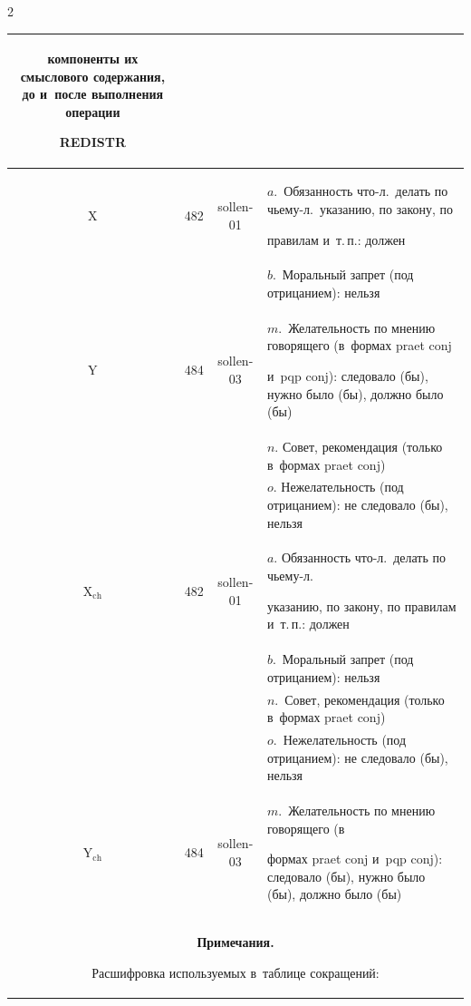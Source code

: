 \begin{multicols}{2}
\begin{table}
\begin{center}
\begin{tabular}{|c|c|c|p{120mm}|}
компоненты их смыслового содержания, до и~после выполнения операции 


\mbox{REDISTR}\\


\hline


X&482&sollen-01&$a$.~Обязанность что-л.\ делать по чьему-л.\ указанию, по закону, по 


правилам и~т.\,п.: должен\\


&&&$b$.~Моральный запрет (под отрицанием): нельзя\\


\hline


Y&484&sollen-03&$m$.~Желательность по мнению говорящего (в~формах praet conj 


и~pqp conj): следовало (бы), нужно было (бы), должно было (бы)\\


&&&$n$. Совет, рекомендация (только в~формах praet conj)\\


&&&$o$. Нежелательность (под отрицанием): не следовало (бы), нельзя\\


\hline


X$_{\mathrm{ch}}$&482&sollen-01&$a$. Обязанность что-л.\ делать по чьему-л.\ 


указанию, по закону, по правилам и~т.\,п.: должен\\


&&&$b$.~Моральный запрет (под отрицанием): нельзя\\


&&&$n$.~Совет, рекомендация (только в~формах praet conj)\\


&&&$o$.~Нежелательность (под отрицанием): не следовало (бы), нельзя\\


\hline


Y$_{\mathrm{ch}}$&484&sollen-03&$m$.~Желательность по мнению говорящего (в 


формах praet conj и~pqp conj): следовало (бы), нужно было (бы), должно было (бы)\\


\hline


\multicolumn{4}{p{162.7mm}}{\footnotesize\hspace*{3mm}\textbf{Примечания.}


Расшифровка используемых в~таблице сокращений:


\begin{itemize}



\end{itemize}}
\end{tabular}
\end{center}
\end{table}
\end{multicols}
